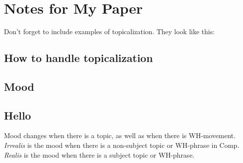 \documentclass[14pt]{article}
\begin{document}
\section*{Notes for My Paper}

Don't forget to include examples of topicalization.
They look like this:

\subsection*{How to handle topicalization}

\subsection*{Mood}

\subsection*{Hello}

Mood changes when there is a topic, as well as when
there is WH-movement.  \emph{Irrealis} is the mood when
there is a non-subject topic or WH-phrase in Comp.
\emph{Realis} is the mood when there is a subject topic
or WH-phrase.
\end{document}
